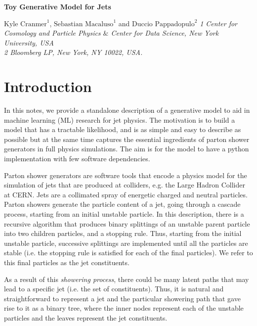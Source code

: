 \documentclass[12pt]{article}
\begin{document}
%


\begin{center}

\vskip 1cm
{\Large \bf Toy Generative Model for Jets}

\vskip 1.0cm
{\large $\text{Kyle Cranmer}^1$, $\text{Sebastian Macaluso}^1$ and $\text{Duccio Pappadopulo}^2$}
\vskip 0.6cm
{\small \it 1 Center for Cosmology and Particle Physics $\&$ Center for Data Science, New York University, USA} \\
{\small \it 2 Bloomberg LP, New York, NY 10022, USA.}
\vskip 2.0cm

\end{center}




\section{Introduction}

In this notes, we provide a standalone description of a generative model to aid in machine learning (ML) research for jet physics. The motivation is to build a model that has a tractable likelihood, and is as simple and easy to describe as possible but at the same time captures the essential ingredients of parton shower generators in full physics simulations.  The aim is for the model to have a python implementation with few software dependencies.

Parton shower generators are software tools that encode a physics model for the simulation of jets that are produced at colliders, e.g. the Large Hadron Collider at CERN.
Jets are a collimated spray of energetic charged and neutral particles. Parton showers generate the particle content of a jet, going through a cascade process, starting from an initial unstable particle. In this description, there is a recursive algorithm that produces binary splittings of an unstable parent particle into two children particles, and a stopping rule. Thus, starting from the initial unstable particle, successive splittings are implemented until all the particles are stable (i.e. the stopping rule is satisfied for each of the final particles). We refer to this final particles as the jet constituents.

As a result of this {\it showering process}, there could be many latent paths that may lead to a specific jet (i.e. the set of constituents). Thus, it is natural and straightforward to represent a jet and the particular showering path that gave rise to it as a binary tree, where the inner nodes represent each of the unstable particles and the leaves represent the jet constituents.  
\end{document}
